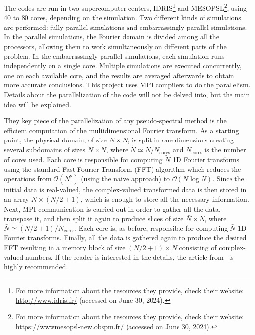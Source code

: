 \documentclass[../main.tex]{subfiles}
\begin{document}
The codes are run in two supercomputer centers, IDRIS\footnote{For more information about the resources they provide, check their website: \url{http://www.idris.fr/} (accessed on June 30, 2024).} and MESOPSL\footnote{For more information about the resources they provide, check their website: \url{https://wwwmesopsl-new.obspm.fr/} (accessed on June 30, 2024).}, using 40 to 80 cores, depending on the simulation. Two different kinds of simulations are performed: fully parallel simulations and embarrassingly parallel simulations. In the parallel simulations, the Fourier domain is divided among all the processors, allowing them to work simultaneously on different parts of the problem. In the embarrassingly parallel simulations, each simulation runs independently on a single core. Multiple simulations are executed concurrently, one on each available core, and the results are averaged afterwards to obtain more accurate conclusions. This project uses MPI compilers to do the parallelism. Details about the parallelization of the code will not be delved into, but the main idea will be explained.

They key piece of the parallelization of any pseudo-spectral method is the efficient computation of the multidimensional Fourier transform. As a starting point, the physical domain, of size $N\times N$, is split in one dimensions creating several subdomains of sizes $\tilde{N}\times N$, where $\tilde{N} \simeq N/N_\mathrm{cores}$ and $N_\mathrm{cores}$ is the number of cores used. Each core is responsible for computing $\tilde{N}$ 1D Fourier transforms using the standard Fast Fourier Transform (FFT) algorithm which reduces the operations from $\mathcal{O}(N^2)$ (using the naive approach) to $\mathcal{O}(N\log N)$. Since the initial data is real-valued, the complex-valued transformed data is then stored in an array $\tilde{N}\times (N/2 + 1)$, which is enough to store all the necessary information. Next, MPI communication is carried out in order to gather all the data, transpose it, and then split it again to produce slices of size $\bar{N}\times N$, where $\bar{N} \simeq (N/2 + 1)/N_\mathrm{cores}$. Each core is, as before,
responsible for computing $\bar{N}$ 1D Fourier transforms. Finally, all the data is gathered again to produce the desired FFT resulting in a memory block of size $(N/2 + 1)\times N$ consisting of complex-valued numbers. If the reader is interested in the details, the article from~\cite{mpi} is highly recommended.
\end{document}
